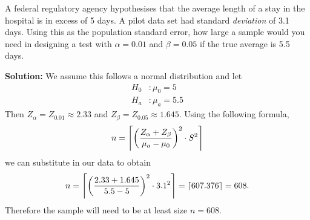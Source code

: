 A federal regulatory agency hypothesises that the average length of a stay in the hospital is in excess of 5 days.  A pilot data set had standard \textit{deviation} of 3.1 days.  Using this as the population standard error, how large a sample would you need in designing a test with $\alpha=0.01$ and $\beta=0.05$ if the true average is 5.5 days.

\begin{mybox}
    \textbf{Solution:} We assume this follows a normal distribution and let 
    \begin{align*}
        H_0 &: \mu_0 = 5
        \\ H_a &: \mu_a = 5.5
    \end{align*}
    Then $Z_{\alpha} = Z_{0.01} \approx 2.33$ and $Z_{\beta} = Z_{0.05} \approx 1.645$.
    Using the following formula,
    $$n = \left\lceil { \left( \frac{{Z_{\alpha}+Z_{\beta}}}{{\mu_a - \mu_0}} \right) ^2 \cdot S^2 } \right\rceil$$
    we can substitute in our data to obtain
    $$n = \left\lceil {\left( \frac{{2.33 + 1.645}}{{5.5-5}} \right) ^2 \cdot 3.1^2 } \right\rceil = \left\lceil {607.376} \right\rceil = 608.$$
    Therefore the sample will need to be at least size $n = 608$.
\end{mybox}
